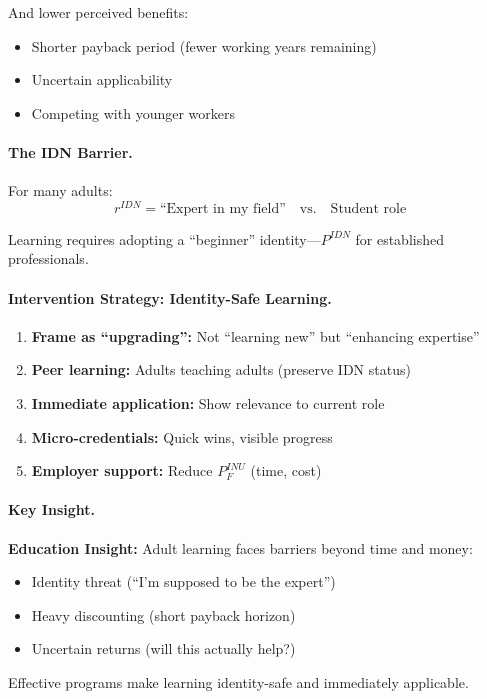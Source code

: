 And lower perceived benefits:
\begin{itemize}
\item Shorter payback period (fewer working years remaining)
\item Uncertain applicability
\item Competing with younger workers
\end{itemize}

\paragraph{The IDN Barrier.}
For many adults:
\begin{equation}
r^{IDN} = \text{``Expert in my field''} \quad \text{vs.} \quad \text{Student role}
\end{equation}

Learning requires adopting a ``beginner'' identity---$P^{IDN}$ for established
professionals.

\paragraph{Intervention Strategy: Identity-Safe Learning.}
\begin{enumerate}
\item \textbf{Frame as ``upgrading'':} Not ``learning new'' but ``enhancing expertise''
\item \textbf{Peer learning:} Adults teaching adults (preserve IDN status)
\item \textbf{Immediate application:} Show relevance to current role
\item \textbf{Micro-credentials:} Quick wins, visible progress
\item \textbf{Employer support:} Reduce $P^{INU}_F$ (time, cost)
\end{enumerate}

\paragraph{Key Insight.}
\begin{tcolorbox}[colback=yellow!10!white, colframe=yellow!50!black]
\textbf{Education Insight:}
Adult learning faces barriers beyond time and money:
\begin{itemize}
\item Identity threat (``I'm supposed to be the expert'')
\item Heavy discounting (short payback horizon)
\item Uncertain returns (will this actually help?)
\end{itemize}
Effective programs make learning identity-safe and immediately applicable.
\end{tcolorbox}

